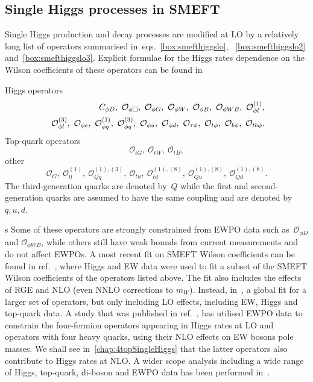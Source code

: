 \subsection{Single Higgs processes in SMEFT}
Single Higgs production and decay processes are modified at LO by a relatively long list of operators summarised in~eqs.~\eqref{box:smefthiggslo}, ~\eqref{box:smefthiggslo2} and~\eqref{box:smefthiggslo3}. Explicit formulae for the Higgs rates dependence on the Wilson coefficients of these operators can be found in~\cite{ATLAS:2019dhi}
\begin{tcolorbox}[title=SMEFT operators modifying Higgs rates at LO,
	title filled=false,
	colback=Mahogany!5!white,
	colframe=Mahogany ]
	Higgs operators
	\begin{align}
		C_{\phi D}, \ \mathcal{O}_{\phi \Box},\ \mathcal{O}_{\phi G}, \ \mathcal{O}_{\phi W},\ \mathcal{O}_{\phi B}, \ \mathcal{O}_{\phi W B},\ \mathcal{O}_{\phi l}^{(1)}, \nn \\
		\ \mathcal{O}_{\phi l}^{(3)}, \ \mathcal{O}_{\phi e},\ \mathcal{O}_{\phi q}^{(1)},\ \mathcal{O}_{\phi q}^{(3)}, \  \mathcal{O}_{\phi u}, \ \mathcal{O}_{\phi d},\ \mathcal{O}_{\tau \phi}, \ \mathcal{O}_{t \phi}, \ \mathcal{O}_{b \phi},\ \mathcal{O}_{tb \phi}.
		\label{box:smefthiggslo}
	\end{align}
	Top-quark operators
	\begin{equation}
		\mathcal{O}_{t G}, \ \mathcal{O}_{t W}, \ \mathcal{O}_{t B},
		\label{box:smefthiggslo2}
	\end{equation}
	other 
	\begin{equation}
		\mathcal{O}_G,\ \mathcal{O}_{ll}^{(1)},\ \mathcal{O}_{Qq}^{(1),(3)},\ \mathcal{O}_{tu},\ \mathcal{O}_{td}^{(1),(8)},\ \mathcal{O}_{Qu}^{(1),(8)}, \ \mathcal{O}_{Qd}^{(1),(8)}.
		\label{box:smefthiggslo3}
	\end{equation}
	The third-generation quarks are denoted by~$Q$ while the first and second-generation quarks are assumed to have the same coupling and are denoted by $q,u,d$.
\end{tcolorbox}s
Some of these operators are strongly constrained from EWPO data such as~$\mathcal{O}_{\phi D}$ and $ \mathcal{O}_{\phi W B}$, while others still have weak bounds from current measurements and do not affect EWPOs. A most recent fit on SMEFT Wilson coefficients can be found in ref.~\cite{Dawson:2020oco}, where Higgs and EW data were used to fit a subset of the SMEFT Wilson coefficients of the operators listed above. The fit also includes the effects of RGE and NLO (even NNLO corrections to $m_W$). Instead, in~\cite{Ethier:2021bye}, a global fit for a larger set of operators, but only including LO effects, including EW, Higgs and top-quark data.  A study that was published in ref.~\cite{Dawson:2022bxd}, has utilised EWPO data to constrain the four-fermion operators appearing in Higgs rates at LO and operators with four heavy quarks, using their NLO effects on EW bosons pole masses. We shall see in~\autoref{chap:4topSingleHiggs} that the latter operators also contribute to Higgs rates at NLO. A wider scope analysis including a wide range of Higgs, top-quark, di-boson and EWPO data has been performed in~\cite{Ellis:2020unq}. \\
